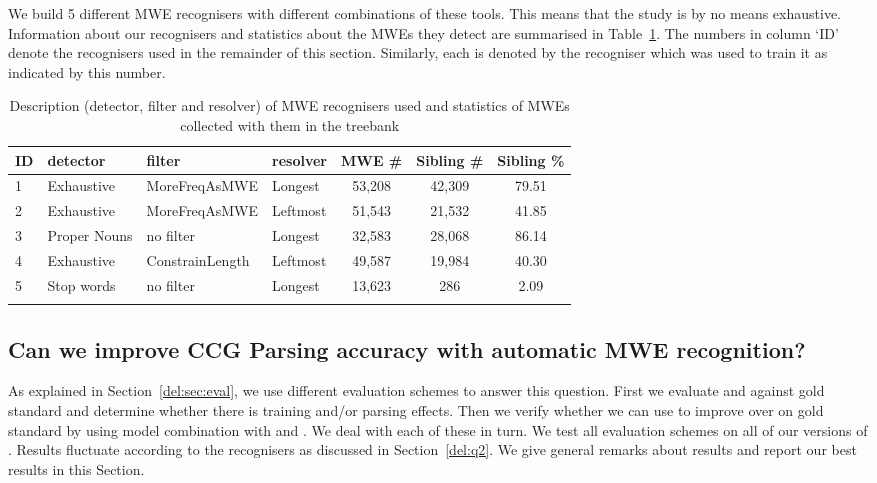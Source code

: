 \documentclass[output=paper]{langsci/langscibook}
\begin{document}
We build 5 different MWE recognisers with different combinations of these tools. This means that the study is by no means exhaustive. Information about our recognisers and statistics about the MWEs they detect are summarised in Table~\ref{del:tab:rec}. The numbers in column `ID' denote the recognisers used in the remainder of this section. Similarly, each {\modelB} is denoted by the recogniser which was used to train it as indicated by this number.\\

\begin{table}[h]
    \footnotesize
    \def\arraystretch{1.20} 
    \begin{tabular}{l l l l c c c} %
      \lsptoprule
        \textnormal{ID}
        & \textnormal{detector}
        & \textnormal{filter}
        & \textnormal{resolver}
        & \textnormal{MWE \#}%
        & \textnormal{Sibling \#}%
        & \textnormal{Sibling \%}
        \\ %
        \midrule
        1 & Exhaustive & MoreFreqAsMWE & Longest & 53,208 & 42,309 & 79.51 \\
        2 & Exhaustive & MoreFreqAsMWE & Leftmost & 51,543 & 21,532 & 41.85 \\
        3 & Proper Nouns &no filter & Longest & 32,583 & 28,068 & 86.14 \\
        4 & Exhaustive & ConstrainLength & Leftmost & 49,587 & 19,984 & 40.30 \\
        5 & Stop words & no filter & Longest & 13,623 & 286 & 2.09 \tabularnewline %
        \lspbottomrule
    \end{tabular}
    \caption{Description (detector, filter and resolver) of MWE recognisers used and statistics of MWEs collected with them in the treebank}
    \label{del:tab:rec}
\end{table}


\subsection{Can we improve CCG Parsing accuracy with automatic MWE recognition?}
\label{del:q1}
\indent As explained in Section~\ref{del:sec:eval}, we use different evaluation schemes to answer this question. First we evaluate {\modelB} and {\modelA} against gold standard and determine whether there is training and/or parsing effects. Then we verify whether we can use {\modelB} to improve over {\modelA} on gold standard by using model combination with {\modelA} and {\modelB}. We deal with each of these in turn. We test all evaluation schemes on all of our versions of {\modelB}. Results fluctuate according to the recognisers as discussed in Section~\ref{del:q2}. We give general remarks about results and report our best results in this Section.
\end{document}
